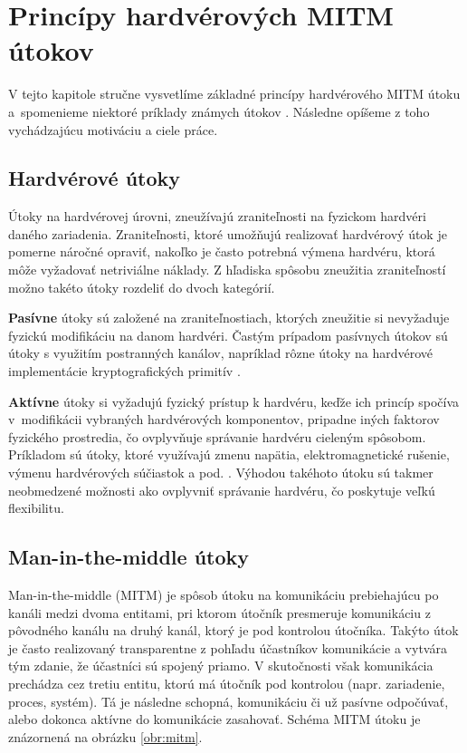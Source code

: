 \chapter{Princípy hardvérových MITM útokov}
\label{kap:principy}
V tejto kapitole stručne vysvetlíme základné princípy hardvérového MITM útoku a~spomenieme niektoré príklady známych útokov \cite{mitmI2C, mitmSmartphone, mitmBitlocker, mitmTouch, mitmTPM}. Následne opíšeme z toho vychádzajúcu motiváciu a ciele práce.

\section{Hardvérové útoky}
Útoky na hardvérovej úrovni, zneužívajú zraniteľnosti na fyzickom hardvéri daného zariadenia. Zraniteľnosti, ktoré umožňujú realizovať hardvérový útok je pomerne náročné opraviť, nakoľko je často potrebná výmena hardvéru, ktorá môže vyžadovať netriviálne náklady. Z hľadiska spôsobu zneužitia zraniteľností možno takéto útoky rozdeliť do dvoch kategórií.

\textbf{Pasívne} útoky sú založené na zraniteľnostiach, ktorých zneužitie si nevyžaduje fyzickú modifikáciu na danom hardvéri. Častým prípadom pasívnych útokov sú útoky s využitím postranných kanálov, napríklad rôzne útoky na hardvérové implementácie kryptografických primitív \cite{hwSec}.

\textbf{Aktívne} útoky si vyžadujú fyzický prístup k hardvéru, keďže ich princíp spočíva v~modifikácii vybraných hardvérových komponentov, pripadne iných faktorov fyzického prostredia, čo ovplyvňuje správanie hardvéru cieleným spôsobom. Príkladom sú útoky, ktoré využívajú zmenu napätia, elektromagnetické rušenie, výmenu hardvérových súčiastok a pod. \cite{hwSec}. Výhodou takéhoto útoku sú takmer neobmedzené možnosti ako ovplyvniť správanie hardvéru, čo poskytuje veľkú flexibilitu.

\section{Man-in-the-middle útoky}
Man-in-the-middle (MITM) je spôsob útoku na komunikáciu prebiehajúcu po kanáli medzi dvoma entitami, pri ktorom útočník presmeruje komunikáciu z pôvodného kanálu na druhý kanál, ktorý je pod kontrolou útočníka. Takýto útok je často realizovaný transparentne z pohľadu účastníkov komunikácie a vytvára tým zdanie, že účastníci sú spojený priamo. V skutočnosti však komunikácia prechádza cez tretiu entitu, ktorú má útočník pod kontrolou (napr. zariadenie, proces, systém). Tá je následne schopná, komunikáciu či už pasívne odpočúvať, alebo dokonca aktívne do komunikácie zasahovať. Schéma MITM útoku je znázornená na obrázku \ref{obr:mitm}.

